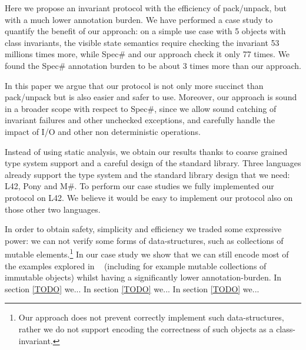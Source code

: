 \LINE




Here we propose an invariant protocol with the 
efficiency of pack/unpack, but with a much lower annotation burden.
We have performed a case study to quantify the benefit of our approach:
on a simple use case with 5 objects with class invariants, the visible state semantics 
require checking the invariant 53 millions times more,
while Spec\# and our approach check it only 77 times.
We found the Spec\# annotation burden to be about 3 times more 
than our approach.

In this paper we argue that our protocol is not only more succinct than pack/unpack but is also easier and safer to use.
Moreover, our approach is sound in a broader scope with respect to Spec\#, since we allow sound catching of invariant failures and other unchecked exceptions, and carefully handle
the impact of I/O and other non deterministic operations.

Instead of using static analysis,
we obtain our results thanks to coarse grained type system support and a careful design of the standard library. Three languages already support the type system and the standard library design that we need:
L42, Pony and M\#. To perform our case studies we fully implemented our protocol on L42.
We believe it would be easy to implement our protocol also on those other two languages.

In order to obtain safety, simplicity and efficiency we traded some expressive power:
we can not verify some forms of data-structures, such as collections of mutable elements.\footnote{Our approach does not prevent correctly implement such data-structures, rather we do not support encoding the correctness of such objects as a class-invariant.}
In our case study we show that
we can still encode most of the examples explored in ~\cite{???} (including for example mutable collections of immutable objects) whilst having a significantly lower annotation-burden.
In section \ref{TODO} we...
In section \ref{TODO} we...
In section \ref{TODO} we...

